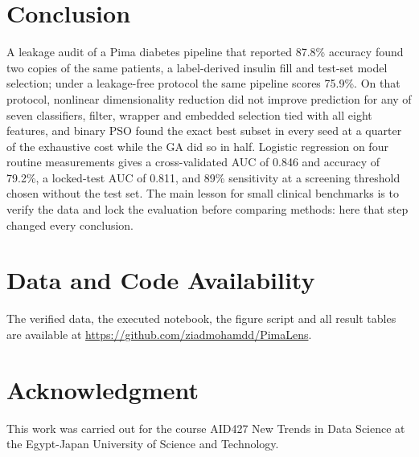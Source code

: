 \documentclass[conference]{IEEEtran}
\begin{document}
\section{Conclusion}

A leakage audit of a Pima diabetes pipeline that reported 87.8\% accuracy found two copies of the same patients, a label-derived insulin fill and test-set model selection; under a leakage-free protocol the same pipeline scores 75.9\%. On that protocol, nonlinear dimensionality reduction did not improve prediction for any of seven classifiers, filter, wrapper and embedded selection tied with all eight features, and binary PSO found the exact best subset in every seed at a quarter of the exhaustive cost while the GA did so in half. Logistic regression on four routine measurements gives a cross-validated AUC of 0.846 and accuracy of 79.2\%, a locked-test AUC of 0.811, and 89\% sensitivity at a screening threshold chosen without the test set. The main lesson for small clinical benchmarks is to verify the data and lock the evaluation before comparing methods: here that step changed every conclusion.

\section*{Data and Code Availability}
The verified data, the executed notebook, the figure script and all result tables are available at \url{https://github.com/ziadmohamdd/PimaLens}.

\section*{Acknowledgment}
This work was carried out for the course AID427 New Trends in Data Science at the Egypt-Japan University of Science and Technology.

\clearpage
\end{document}
